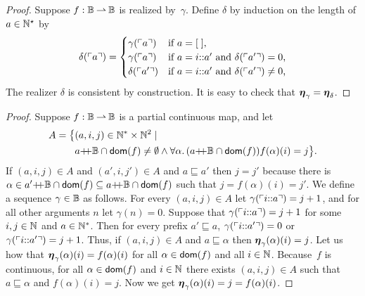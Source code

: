 \begin{proof}
  Suppose $f : \mathbb{B} \mathbin{\rightharpoonup} \mathbb{B}$ is realized by~$\gamma$. Define
  $\delta$ by induction on the length of $a \in \mathbb{N}^{\star}$ by
  \begin{equation*}
    \delta(\ulcorner a \urcorner) =
    \begin{cases}
      \gamma(\ulcorner a \urcorner) & \text{if $a = [\;]$,}\\
      \gamma(\ulcorner a \urcorner) & \text{if $a = i {:}{:} a'$ and
        $\delta(\ulcorner a' \urcorner) = 0$,}\\
      \delta(\ulcorner a' \urcorner) & \text{if $a = i {:}{:} a'$ and
        $\delta(\ulcorner a' \urcorner) \neq 0$,}
    \end{cases}
  \end{equation*}
  The realizer $\delta$ is consistent by construction. It is easy to check that $\text{\boldmath{$\eta$}}_\gamma = \text{\boldmath{$\eta$}}_\delta$.
\end{proof}


\begin{proof}
  Suppose $f: \mathbb{B} \mathbin{\rightharpoonup} \mathbb{B}$ is a partial continuous map, and let
  \begin{align*}
     A = \big\{ & (a, i, j) \in \mathbb{N}^{*} \times \mathbb{N}^{2} \mid \\
       &a{{+}\!\!{+}}\mathbb{B} \cap \mathsf{dom}(f) \neq \emptyset \land
        \forall \alpha .\,{(a{{+}\!\!{+}}\mathbb{B} \cap \mathsf{dom}(f))}{
          f(\alpha)(i) = j
          }
        \big\}.
  \end{align*}
  If $(a, i, j) \in A$ and $(a', i, j') \in A$ and $a \sqsubseteq a'$
  then $j = j'$ because there is $\alpha \in a'{{+}\!\!{+}}\mathbb{B} \cap
  \mathsf{dom}(f) \subseteq a{{+}\!\!{+}}\mathbb{B} \cap \mathsf{dom}(f)$ such that $j =
  f(\alpha)(i) = j'$. We define a sequence $\gamma \in \mathbb{B}$ as
  follows. For every $(a, i, j) \in A$ let
  $\gamma(\ulcorner i {:}{:} a \urcorner) = j + 1$, and for all other
  arguments $n$ let $\gamma(n) = 0$. Suppose that
  $\gamma(\ulcorner i {:}{:} a \urcorner) = j + 1$ for some $i, j \in \mathbb{N}$
  and $a \in \mathbb{N}^{*}$. Then for every prefix $a' \sqsubseteq a$,
  $\gamma(\ulcorner i {:}{:} a' \urcorner) = 0$ or
  $\gamma(\ulcorner i {:}{:} a' \urcorner) = j + 1$. Thus, if $(a, i, j) \in
  A$ and $a \sqsubseteq \alpha$ then $\text{\boldmath{$\eta$}}_{\gamma}(\alpha)(i) = j$.
  Let us how that $\text{\boldmath{$\eta$}}_{\gamma}(\alpha)(i) = f(\alpha)(i)$ for all
  $\alpha \in \mathsf{dom}(f)$ and all $i \in \mathbb{N}$. Because~$f$ is continuous,
  for all $\alpha \in \mathsf{dom}(f)$ and $i \in \mathbb{N}$ there exists $(a, i, j)
  \in A$ such that $a \sqsubseteq \alpha$ and $f(\alpha)(i) = j$. Now
  we get
  $
    \text{\boldmath{$\eta$}}_{\gamma}(\alpha)(i)
    = j
    = f(\alpha)(i)
  $.
\end{proof}

